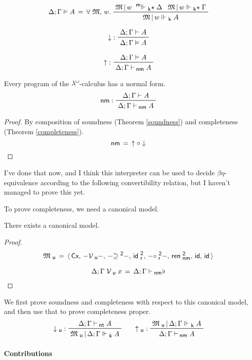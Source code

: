 \documentclass{entcs}
\numberwithin{equation}{thm}
\newcommand{\lambdabox}{\lambda^{\mkern-1mu\sq\mkern-2mu}}
\newcommand{\binop}[1]{-\mathord{#1}-}
\newcommand{\tsf}[1]{\textsf{\upshape{#1}}}
\newcommand{\stsf}[1]{\tsf{\small{#1}}}
\renewcommand{\:}{\mathrel{:}}
\newcommand{\tyrule}[1]{\prftree[l]{${#1} \:\,$}}
\newcommand{\id}{\operatorname{\tsf{id}}}
\newcommand{\comp}{\mathrel{\circ}}
\let\oldforall\forall
\renewcommand{\forall}{\oldforall\,}
\newcommand{\0}{\varnothing}
\newcommand{\geqZ}{\mathrel{\supseteq^{\stsf{2}}}}
\newcommand{\ideZ}{\operatorname{\tsf{id}_{\stsf{r}}^{\stsf{2}}}}
\newcommand{\compeZ}{\mathrel{\circ_{\mkern-1mu\stsf{r}}^{\stsf{2}}}}
\newcommand{\base}{\flat}
\newcommand{\sq}{\Box}
\newcommand{\Cx}{\tsf{Cx}}
\renewcommand{\e}{\mathrel{\vdash}}
\newcommand{\enm}{\mathrel{\vdash_{\mkern-2mu\stsf{nm}}}}
\newcommand{\ent}{\mathrel{\vdash_{\mkern-2mu\stsf{nt}}}}
\newcommand{\rennmZ}{\operatorname{\tsf{ren}_{\stsf{nm}}^{\stsf{2}}}}
\newcommand{\M}{\mathfrak{M}}
\newcommand{\eek}{\mathrel{\Vdash_{\stsf{k}}}}
\newcommand{\eeks}{\mathrel{\Vdash_{\stsf{k}}\mkern-5mu\star}}
\newcommand{\meeks}{\mathrel{^{\stsf{m}\mkern-6mu}\Vdash_{\stsf{k}}\mkern-5mu\star}}
\newcommand{\eeq}{\mathrel{\vDash}}
\newcommand{\reflect}{\operatorname{\downarrow}}
\newcommand{\Mu}{\mathfrak{M}_{\stsf{u}}}
\newcommand{\Vu}{\mathrel{\mathcal{V}_{\stsf{u}}}}
\newcommand{\reifyu}{\operatorname{\uparrow_{\stsf{u}}}}
\newcommand{\reflectu}{\operatorname{\downarrow_{\stsf{u}}}}
\newcommand{\reify}{\operatorname{\uparrow}}
\newcommand{\nm}{\operatorname{\tsf{nm}}}
\begin{document}
  \[\Delta; \Gamma \eeq A \,=\, \forall \M,\,w.\ \raisebox{-8pt}{$\prftree{\M\,|\,w \meeks \Delta}{\M\,|\,w \eeks \Gamma}{\M\,|\,w \eek A}$}\]
\begin{theorem}[Soundness]
  \[\tyrule{\reflect}{\Delta; \Gamma \e A}{\Delta; \Gamma \eeq A}\]
\end{theorem}
\begin{theorem}[Completeness]
  \[\tyrule{\reify}{\Delta; \Gamma \eeq A}{\Delta; \Gamma \enm A}\]
\end{theorem}
\begin{corollary}[Normalisation]
  Every program of the $\lambdabox$-calculus has a normal form.
  \[\tyrule{\nm}{\Delta; \Gamma \e A}{\Delta; \Gamma \enm A}\]
  \begin{proof}\normalshape %
    By composition of soundness (Theorem \ref{soundness}) and completeness (Theorem \ref{completeness}).
    \[\nm \,=\, \reify \comp \reflect\]
  \end{proof}
\end{corollary}\noindent %
I've done that now, and I think this interpreter can be used to decide $\beta\eta$-equivalence according to the following convertibility relation, but I haven't managed to prove this yet.

To prove completeness, we need a canonical model.
\begin{theorem}
  There exists a canonical model.
  \begin{proof}\normalshape %
    \begin{gather*}
      \Mu \,=\, \langle\,\Cx,\,\binop{\Vu},\,\binop{\geqZ},\,\ideZ,\,\binop{\compeZ},\,\rennmZ,\,\id,\,\id\,\rangle\\[0.5\baselineskip]
      \Delta; \Gamma \Vu x \,=\, \Delta; \Gamma \enm \mkern-4mu \base
    \end{gather*}
  \end{proof}
\end{theorem}\noindent %
We first prove soundness and completeness with respect to this canonical model, and then use that to prove completeness proper.
\begin{gather*}
  \tyrule{\reflectu}{\Delta; \Gamma \ent A}{\Mu\,|\,\Delta; \Gamma \eek A}\qquad
  \tyrule{\reifyu}{\Mu\,|\,\Delta; \Gamma \eek A}{\Delta; \Gamma \enm A}
\end{gather*}

\paragraph{Contributions}
\lipsum[1-2]
\end{document}
